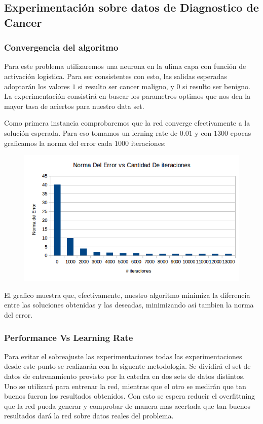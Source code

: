 \subsection{Experimentación sobre datos de Diagnostico de Cancer}

\subsubsection{Convergencia del algoritmo} 

Para este problema utilizaremos una neurona en la ulima capa con función de activación logistica. Para ser consistentes con esto, las salidas esperadas adoptarán los valores $1$ si resulto ser cancer maligno, y $0$ si resulto ser benigno. La experimentación consistirá en buscar los parametros optimos que nos den la mayor tasa de aciertos para nuestro data set.

Como primera instancia comprobaremos que la red converge efectivamente a la solución esperada. Para eso tomamos un lerning rate de $0.01$ y con $1300$ epocas graficamos la norma del error cada $1000$ iteraciones:

\begin{figure}[h!]
  \centering
    \includegraphics[scale=0.4]{ej1_convergencia/1.png}
\end{figure}

El grafico muestra que, efectivamente, nuestro algoritmo minimiza la diferencia entre las soluciones obtenidas y las deseadas, minimizando así tambien la norma del error.

\subsubsection{Performance Vs Learning Rate} 

Para evitar el sobreajuste las experimentaciones todas las experimentaciones desde este punto se realizarán con la siguente metodología. Se dividirá el set de datos de entrenamiento provisto por la catedra en dos sets de datos distintos. Uno se utilizará para entrenar la red, mientras que el otro se medirán que tan buenos fueron los resultados obtenidos. Con esto se espera reducir el overfittning que la red pueda generar y comprobar de manera mas acertada que tan buenos resultados dará la red sobre datos reales del problema.


